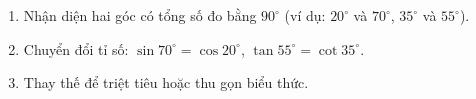 \begin{enumerate}
\item Nhận diện hai góc có tổng số đo bằng $90^\circ$ (ví dụ: $20^\circ$ và $70^\circ$, $35^\circ$ và $55^\circ$).
\item Chuyển đổi tỉ số: $\sin 70^\circ = \cos 20^\circ$, $\tan 55^\circ = \cot 35^\circ$.
\item Thay thế để triệt tiêu hoặc thu gọn biểu thức.
\end{enumerate}
